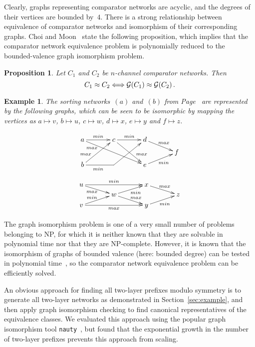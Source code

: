 \documentclass[10pt]{IEEEtran}
\newtheorem{proposition}{Proposition}
\newtheorem{example}{Example}
\begin{document}
Clearly, graphs representing comparator networks are acyclic, and the
degrees of their vertices are bounded by~$4$.  There is a strong
relationship between equivalence of comparator networks and
isomorphism of their corresponding graphs. Choi and
Moon~\cite{DBLP:conf/gecco/ChoiM02} state the following proposition,
which implies that the comparator network equivalence problem is
polynomially reduced to the bounded-valence graph isomorphism problem.

\begin{proposition}\label{proposition:isomorphism}
  Let $C_1$ and $C_2$ be $n$-channel comparator networks. Then
\[ C_1\approx C_2 \Longleftrightarrow {\cal G}(C_1) \approx {\cal G}(C_2)\,.
\]
\end{proposition}


\begin{example}
  The sorting networks~$(a)$ and~$(b)$ from Page~\pageref{ex:sn} are
  represented by the following graphs,
  which can be seen to be isomorphic by mapping the vertices as
$a\mapsto v$, $b\mapsto u$, $c\mapsto w$, $d\mapsto x$, $e\mapsto y$ and
$f\mapsto z$.

{\small 
\[
\xymatrix@R-2em@C+1em{
  a \ar[r]^{min} \ar[rrdd]_(.2){max}
  & c \ar[r]^{min} \ar[rdd]^(.7){max}
  & d \ar[rd]^{max}
  \\
  &&& f
  \\
  b \ar[ruu]^(.3){max} \ar'[r]+0_{min}[rruu]
  && e \ar[ur]_{min}
}
\]
\[
\xymatrix@R-2em@C+1em{
  u \ar[rr]^{min} \ar[dr]_(.4){max}
  &&
  x \ar[rd]^{max}
  \\
  & w \ar[ru]_(.6){min} \ar[rd]^(.6){max}
  && z
  \\
  v \ar[ur]^(.4){min} \ar[rr]_{max}
  &&
  y \ar[ur]_{min}
}
\]
}
\end{example}

The graph isomorphism problem is one of a very small number of
problems belonging to NP, for which it is neither known that they are solvable in
polynomial time nor that they are NP-complete.  However, it is known that
the isomorphism of graphs of bounded valence (here: bounded degree) can be tested in
polynomial time~\cite{DBLP:journals/jcss/Luks82}, so the comparator
network equivalence problem can be efficiently solved.

An obvious approach for finding all two-layer prefixes modulo symmetry
is to generate all two-layer networks as demonstrated in
Section~\ref{sec:example}, and then apply graph isomorphism checking to find
canonical representatives of the equivalence classes. 
We evaluated this approach using the popular graph isomorphism tool
\verb!nauty!~\cite{DBLP:journals/jsc/McKayP14}, but found that the
exponential growth in the number of two-layer prefixes prevents this
approach from scaling.
\end{document}
